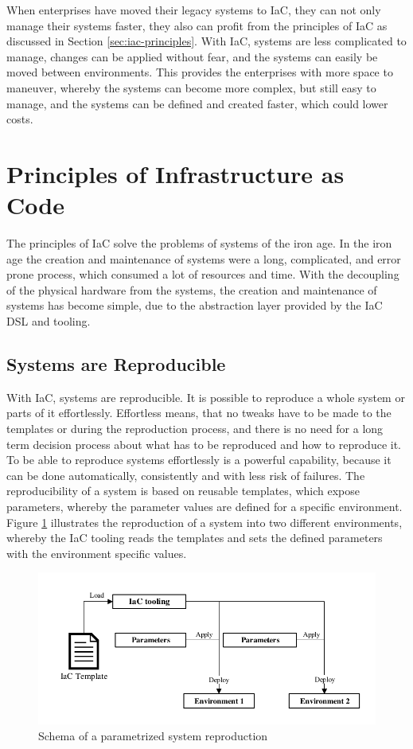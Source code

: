 When enterprises have moved their legacy systems to IaC, they can not only manage their systems faster, they also can profit from the principles of IaC as discussed in Section \vref{sec:iac-principles}. With IaC, systems are less complicated to manage, changes can be applied without fear, and the systems can easily be moved between environments. This provides the enterprises with more space to maneuver, whereby the systems can become more complex, but still easy to manage, and the systems can be defined and created faster, which could lower costs.    

\section{Principles of Infrastructure as Code}
\label{sec:iac-principles}
The principles of IaC solve the problems of systems of the iron age. In the iron age the creation and maintenance of systems were a long, complicated, and error prone process, which consumed a lot of resources and time. With the decoupling of the physical hardware from the systems, the creation and maintenance of systems has become simple, due to the abstraction layer provided by the IaC DSL and tooling. 

\subsection{Systems are Reproducible}
\label{sec:iac-principles-reproducibility}
With IaC, systems are reproducible. It is possible to reproduce a whole system or parts of it effortlessly. Effortless means, that no tweaks have to be made to the templates or during the reproduction process, and there is no need for a long term decision process about what has to be reproduced and how to reproduce it. To be able to reproduce systems effortlessly is a powerful capability, because it can be done automatically, consistently and with less risk of failures. The reproducibility of a system is based on reusable templates, which expose parameters, whereby the parameter values are defined for a specific environment. Figure \ref{fig:reproduce-infrastructure} illustrates the reproduction of a system into two different environments, whereby the IaC tooling reads the templates and sets the defined parameters with the environment specific values\cite{Morris2016}.

\begin{figure}[htbp]
	\centering
	\includegraphics[scale=1]{images/reproduce-infrastructure.pdf}
	\caption{Schema of a parametrized system reproduction}
	\label{fig:reproduce-infrastructure}
\end{figure} 

